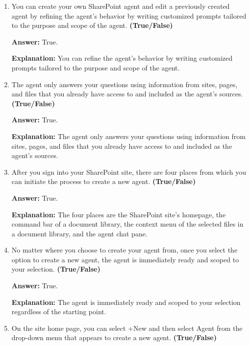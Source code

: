 \documentclass[10pt]{article}
\begin{document}
\begin{enumerate}[leftmargin=*]
\textbf{Answer:} True.

\textbf{Explanation:} You can add or remove the sites, pages, and files your agent should include as knowledge sources beyond the current SharePoint site.

\item You can create your own SharePoint agent and edit a previously created agent by refining the agent's behavior by writing customized prompts tailored to the purpose and scope of the agent. \textbf{(True/False)}

\textbf{Answer:} True.

\textbf{Explanation:} You can refine the agent's behavior by writing customized prompts tailored to the purpose and scope of the agent.

\item The agent only answers your questions using information from sites, pages, and files that you already have access to and included as the agent's sources. \textbf{(True/False)}

\textbf{Answer:} True.

\textbf{Explanation:} The agent only answers your questions using information from sites, pages, and files that you already have access to and included as the agent's sources.

\item After you sign into your SharePoint site, there are four places from which you can initiate the process to create a new agent. \textbf{(True/False)}

\textbf{Answer:} True.

\textbf{Explanation:} The four places are the SharePoint site's homepage, the command bar of a document library, the context menu of the selected files in a document library, and the agent chat pane.

\item No matter where you choose to create your agent from, once you select the option to create a new agent, the agent is immediately ready and scoped to your selection. \textbf{(True/False)}

\textbf{Answer:} True.

\textbf{Explanation:} The agent is immediately ready and scoped to your selection regardless of the starting point.

\item On the site home page, you can select +New and then select Agent from the drop-down menu that appears to create a new agent. \textbf{(True/False)}


\end{enumerate}
\end{document}

